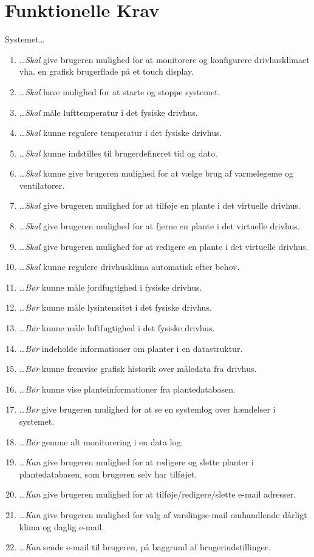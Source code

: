 \section{Funktionelle Krav}
Systemet\ldots
\begin{enumerate}\itemsep1pt \parskip0pt 
	\item \ldots \emph{Skal} give brugeren mulighed for at monitorere og konfigurere drivhusklimaet vha. en grafisk brugerflade på et touch display.
	\item \ldots \emph{Skal} have mulighed for at starte og stoppe systemet.
	\item \ldots \emph{Skal} måle lufttemperatur i det fysiske drivhus.
	\item \ldots \emph{Skal} kunne regulere temperatur i det fysiske drivhus.
	\item \ldots \emph{Skal} kunne indstilles til brugerdefineret tid og dato.
	\item \ldots \emph{Skal} kunne give brugeren mulighed for at vælge brug af varmelegeme og ventilatorer.
	\item \ldots \emph{Skal} give brugeren mulighed for at tilføje en plante i det virtuelle drivhus.
	\item \ldots \emph{Skal} give brugeren mulighed for at fjerne en plante i det virtuelle drivhus.
	\item \ldots \emph{Skal} give brugeren mulighed for at redigere en plante i det virtuelle drivhus.
	\item \ldots \emph{Skal} kunne regulere drivhusklima automatisk efter behov.
	\item \ldots \emph{Bør} kunne måle jordfugtighed i fysiske drivhus.
	\item \ldots \emph{Bør} kunne måle lysintensitet i det fysiske drivhus.
	\item \ldots \emph{Bør} kunne måle luftfugtighed i det fysiske drivhus.
	\item \ldots \emph{Bør} indeholde informationer om planter i en datastruktur.
	\item \ldots \emph{Bør} kunne fremvise grafisk historik over måledata fra drivhus.
	\item \ldots \emph{Bør} kunne vise planteinformationer fra plantedatabasen.
	\item \ldots \emph{Bør} give brugeren mulighed for at se en systemlog over hændelser i systemet.
	\item \ldots \emph{Bør} gemme alt monitorering i en data log.
	\item \ldots \emph{Kan} give brugeren mulighed for at redigere og slette planter i plantedatabasen, som brugeren selv har tilføjet.
	\item \ldots \emph{Kan} give brugeren mulighed for at tilføje/redigere/slette e-mail adresser.
	\item \ldots \emph{Kan} give brugeren mulighed for valg af varslingse-mail omhandlende dårligt klima og daglig e-mail.
	\item \ldots \emph{Kan} sende e-mail til brugeren, på baggrund af brugerindstillinger.
\end{enumerate}

